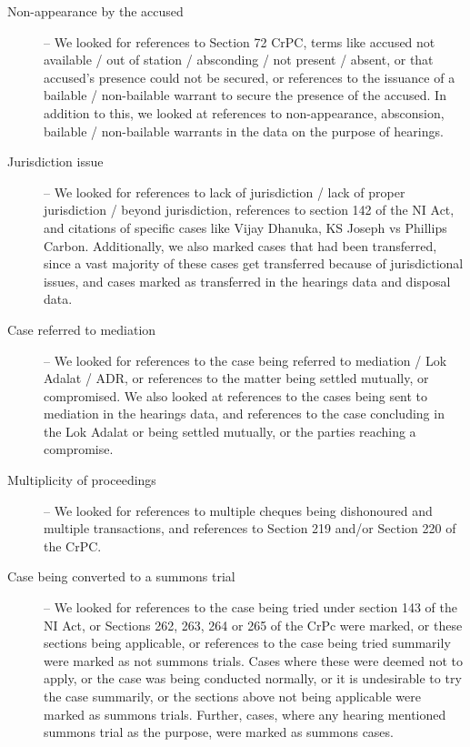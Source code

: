 \begin{description}
\item [Non-appearance by the accused] -- We looked for references to Section 72 CrPC, terms like accused not available / out of station / absconding / not present / absent, or that accused’s presence could not be secured, or references to the issuance of a bailable / non-bailable warrant to secure the presence of the accused. In addition to this, we looked at references to non-appearance, absconsion, bailable / non-bailable warrants in the data on the purpose of hearings.

\item[]

\item [Jurisdiction issue] -- We looked for references to lack of jurisdiction / lack of proper jurisdiction / beyond jurisdiction, references to section 142 of the NI Act, and citations of specific cases like Vijay Dhanuka, KS Joseph vs Phillips Carbon. Additionally, we also marked cases that had been transferred, since a vast majority of these cases get transferred because of jurisdictional issues, and cases marked as transferred in the hearings data and disposal data.

\item[]

\item [Case referred to mediation] -- We looked for references to the case being referred to mediation / Lok Adalat / ADR, or references to the matter being settled mutually, or compromised. We also looked at references to the cases being sent to mediation in the hearings data, and references to the case concluding in the Lok Adalat or being settled mutually, or the parties reaching a compromise.

\item[]

\item [Multiplicity of proceedings] -- We looked for references to multiple cheques being dishonoured and multiple transactions, and references to Section 219 and/or Section 220 of the CrPC.

\item[]

\item [Case being converted to a summons trial] -- We looked for references to the case being tried under section 143 of the NI Act, or Sections 262, 263, 264 or 265 of the CrPc were marked, or these sections being applicable, or references to the case being tried summarily were marked as not summons trials. Cases where these were deemed not to apply, or the case was being conducted normally, or it is undesirable to try the case summarily, or the sections above not being applicable were marked as summons trials. Further, cases, where any hearing mentioned summons trial as the purpose, were marked as summons cases.

\end{description}

